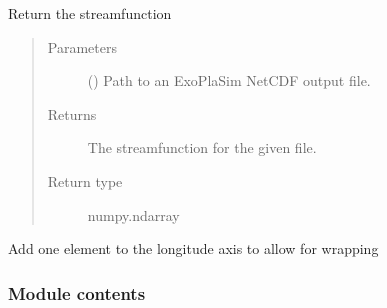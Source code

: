 \documentclass[letterpaper,10pt,english]{sphinxmanual}
\begin{document}
\begin{fulllineitems}
\label{\detokenize{source/exoplasim:exoplasim.gcmt.streamfxn}}
Return the streamfunction
\begin{quote}\begin{description}
\item[{Parameters}] \leavevmode
{} () \textendash{} Path to an ExoPlaSim NetCDF output file.

\item[{Returns}] \leavevmode
The streamfunction for the given file.

\item[{Return type}] \leavevmode
numpy.ndarray

\end{description}\end{quote}

\end{fulllineitems}


\begin{fulllineitems}
\label{\detokenize{source/exoplasim:exoplasim.gcmt.wrap2d}}
Add one element to the longitude axis to allow for wrapping

\end{fulllineitems}



\subsubsection{Module contents}
\label{\detokenize{source/exoplasim:module-exoplasim}}\label{\detokenize{source/exoplasim:module-contents}}
\end{document}
